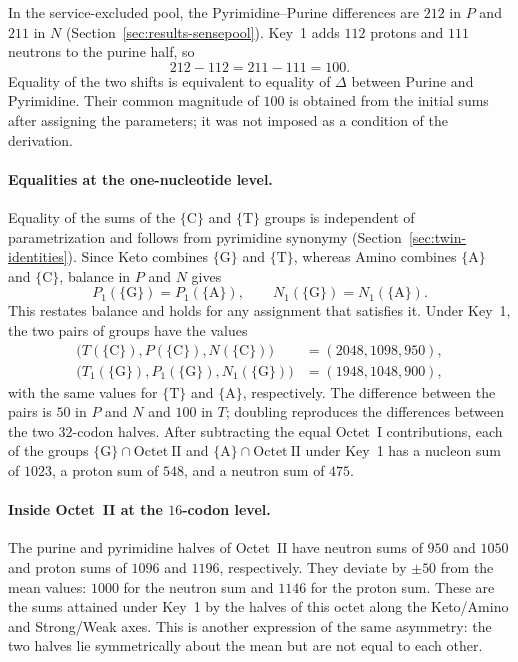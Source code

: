 \documentclass[11pt,a4paper]{article}
\renewcommand{\_}{\origunderscore\allowbreak}
\begin{document}
In the service-excluded pool, the Pyrimidine--Purine
differences are $212$ in $P$ and $211$ in $N$
(Section~\ref{sec:results-sensepool}). Key~1 adds
$112$ protons and $111$ neutrons to the purine half,
so
\[
212-112=211-111=100.
\]
Equality of the two shifts is equivalent to equality
of $\Delta$ between Purine and Pyrimidine. Their common
magnitude of $100$ is obtained from the initial sums
after assigning the parameters; it was not imposed
as a condition of the derivation.

\paragraph{Equalities at the one-nucleotide level.}
Equality of the sums of the $\{\mathrm{C}\}$ and
$\{\mathrm{T}\}$ groups is independent of
parametrization and follows from pyrimidine synonymy
(Section~\ref{sec:twin-identities}). Since Keto combines
$\{\mathrm{G}\}$ and $\{\mathrm{T}\}$, whereas Amino
combines $\{\mathrm{A}\}$ and $\{\mathrm{C}\}$,
balance in $P$ and $N$ gives
\[
P_1(\{\mathrm{G}\})=P_1(\{\mathrm{A}\}),\qquad
N_1(\{\mathrm{G}\})=N_1(\{\mathrm{A}\}).
\]
This restates balance and holds for any assignment
that satisfies it. Under Key~1, the two pairs of
groups have the values
\[
\begin{aligned}
\bigl(T(\{\mathrm{C}\}),P(\{\mathrm{C}\}),N(\{\mathrm{C}\})\bigr)
&=(2048,1098,950),\\
\bigl(T_1(\{\mathrm{G}\}),P_1(\{\mathrm{G}\}),N_1(\{\mathrm{G}\})\bigr)
&=(1948,1048,900),
\end{aligned}
\]
with the same values for $\{\mathrm{T}\}$ and
$\{\mathrm{A}\}$, respectively. The difference between
the pairs is $50$ in $P$ and $N$ and $100$ in $T$;
doubling reproduces the differences between the two
$32$-codon halves. After subtracting the equal Octet~I contributions,
each of the groups
$\{\mathrm{G}\}\cap\mathrm{Octet~II}$ and
$\{\mathrm{A}\}\cap\mathrm{Octet~II}$
under Key~1 has a nucleon sum of $1023$,
a proton sum of $548$, and a neutron sum of $475$.

\paragraph{Inside Octet~II at the $16$-codon level.}
The purine and pyrimidine halves of Octet~II have
neutron sums of $950$ and $1050$ and proton sums of
$1096$ and $1196$, respectively. They deviate by $\pm50$ from the mean values:
$1000$ for the neutron sum and $1146$ for the proton sum.
These are the sums attained under Key~1 by the halves
of this octet along the Keto/Amino and Strong/Weak axes. This is another expression of the
same asymmetry: the two halves lie symmetrically about
the mean but are not equal to each other.
\end{document}
